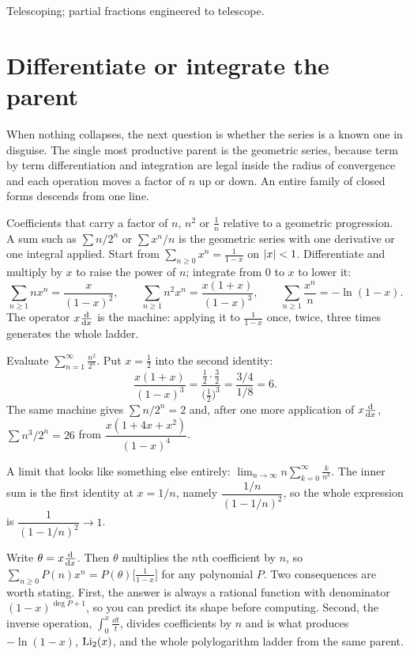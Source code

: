 \begin{seealsob}Telescoping; partial fractions engineered to telescope.\end{seealsob}

\section{Differentiate or integrate the parent}

When nothing collapses, the next question is whether the series is a known one in disguise. The single most productive parent is the geometric series, because term by term differentiation and integration are legal inside the radius of convergence and each operation moves a factor of $n$ up or down. An entire family of closed forms descends from one line.

\cue Coefficients that carry a factor of $n$, $n^{2}$ or $\tfrac1n$ relative to a geometric progression. A sum such as $\sum n/2^{n}$ or $\sum x^{n}/n$ is the geometric series with one derivative or one integral applied.
\method Start from $\displaystyle\sum_{n\geq0}x^{n}=\frac{1}{1-x}$ on $\left\lvert x\right\rvert<1$. Differentiate and multiply by $x$ to raise the power of $n$; integrate from $0$ to $x$ to lower it:
\[\sum_{n\geq1}nx^{n}=\frac{x}{(1-x)^{2}},\qquad \sum_{n\geq1}n^{2}x^{n}=\frac{x(1+x)}{(1-x)^{3}},\qquad \sum_{n\geq1}\frac{x^{n}}{n}=-\ln(1-x).\]
The operator $x\frac{\mathrm{d}}{\mathrm{d}x}$ is the machine: applying it to $\tfrac{1}{1-x}$ once, twice, three times generates the whole ladder.

\begin{worked}
Evaluate $\displaystyle\sum_{n=1}^{\infty}\frac{n^{2}}{2^{n}}$. Put $x=\tfrac12$ into the second identity:
\[\frac{x(1+x)}{(1-x)^{3}}=\frac{\tfrac12\cdot\tfrac32}{\bigl(\tfrac12\bigr)^{3}}=\frac{3/4}{1/8}=6.\]
The same machine gives $\sum n/2^{n}=2$ and, after one more application of $x\frac{\mathrm{d}}{\mathrm{d}x}$, $\sum n^{3}/2^{n}=26$ from $\dfrac{x(1+4x+x^{2})}{(1-x)^{4}}$.

A limit that looks like something else entirely: $\displaystyle\lim_{n\to\infty}n\sum_{k=0}^{\infty}\frac{k}{n^{k}}$. The inner sum is the first identity at $x=1/n$, namely $\dfrac{1/n}{(1-1/n)^{2}}$, so the whole expression is $\dfrac{1}{(1-1/n)^{2}}\to1$.
\end{worked}

\begin{keynote}
Write $\theta=x\frac{\mathrm{d}}{\mathrm{d}x}$. Then $\theta$ multiplies the $n$th coefficient by $n$, so $\sum_{n\geq0}P(n)x^{n}=P(\theta)\bigl[\tfrac{1}{1-x}\bigr]$ for any polynomial $P$. Two consequences are worth stating. First, the answer is always a rational function with denominator $(1-x)^{\deg P+1}$, so you can predict its shape before computing. Second, the inverse operation, $\int_0^x\tfrac{\dd t}{t}$, divides coefficients by $n$ and is what produces $-\ln(1-x)$, $\operatorname{Li}_2(x)$, and the whole polylogarithm ladder from the same parent.
\end{keynote}

